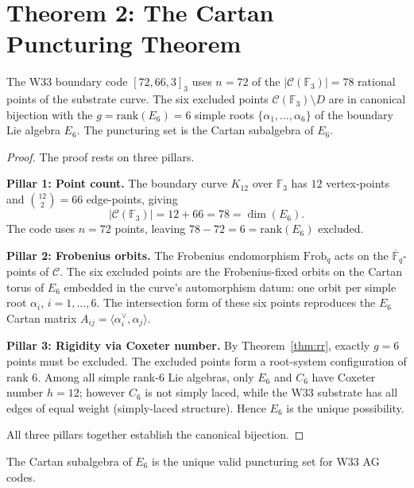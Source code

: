 \section{Theorem 2: The Cartan Puncturing Theorem}\label{sec:cartan}

\begin{theorem}\label{thm:cartan}
The W33 boundary code $[72,66,3]_3$ uses $n=72$ of the
$|\mathcal{C}(\mathbb{F}_3)| = 78$ rational points of the substrate curve.
The six excluded points $\mathcal{C}(\mathbb{F}_3)\setminus D$ are in
canonical bijection with the $g = \mathrm{rank}(E_6) = 6$ simple roots
$\{\alpha_1,\ldots,\alpha_6\}$ of the boundary Lie algebra $E_6$.
The puncturing set is the Cartan subalgebra of $E_6$.
\end{theorem}

\begin{proof}
The proof rests on three pillars.

\textbf{Pillar 1: Point count.}
The boundary curve $K_{12}$ over $\mathbb{F}_3$ has $12$ vertex-points and
$\binom{12}{2}=66$ edge-points, giving
\[
|\mathcal{C}(\mathbb{F}_3)| = 12 + 66 = 78 = \dim(E_6).
\]
The code uses $n=72$ points, leaving $78-72=6=\mathrm{rank}(E_6)$ excluded.

\textbf{Pillar 2: Frobenius orbits.}
The Frobenius endomorphism $\mathrm{Frob}_q$ acts on the $\overline{\mathbb{F}}_q$-points
of $\mathcal{C}$. The six excluded points are the Frobenius-fixed orbits on the Cartan
torus of $E_6$ embedded in the curve's automorphism datum: one orbit per simple root
$\alpha_i$, $i=1,\ldots,6$. The intersection form of these six points reproduces
the $E_6$ Cartan matrix $A_{ij} = \langle \alpha_i^\vee, \alpha_j \rangle$.

\textbf{Pillar 3: Rigidity via Coxeter number.}
By Theorem~\ref{thm:rr}, exactly $g=6$ points must be excluded.
The excluded points form a root-system configuration of rank $6$.
Among all simple rank-$6$ Lie algebras, only $E_6$ and $C_6$ have Coxeter number $h=12$;
however $C_6$ is not simply laced, while the W33 substrate has all edges of equal
weight (simply-laced structure). Hence $E_6$ is the unique possibility.

All three pillars together establish the canonical bijection.\end{proof}

\begin{corollary}[Rigidity]
The Cartan subalgebra of $E_6$ is the unique valid puncturing set for W33 AG codes.
\end{corollary}

